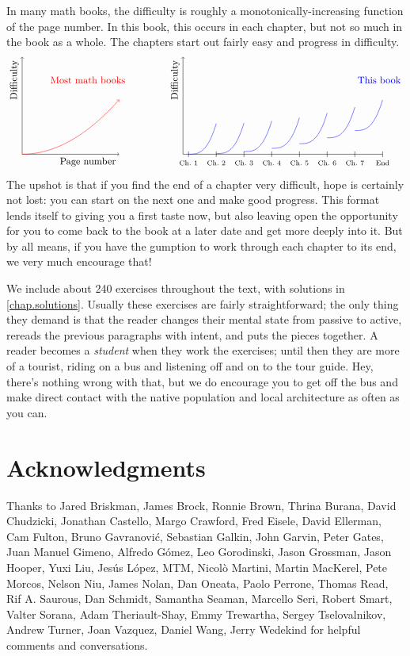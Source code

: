 \documentclass[7Sketches]{subfiles}
\begin{document}
In many math books, the difficulty is roughly a monotonically-increasing function of the page number. In this book, this occurs in each chapter, but not so much in the book as a whole. The chapters start out fairly easy and progress in difficulty.
\[
\begin{tikzpicture}
  \draw[->] (0,0) -- (3.5,0) node[below left] (p) {Page number};
  \draw[->] (0,0) -- (0,3.5) node[above left, rotate=90] (d) {Difficulty};
  \draw[color=red, domain=0:3.5, ->] plot (\x,{.16*\x^2)});
  \node[red] at (p|-d) {Most math books};
%
  \draw (5.8,0) -- (13,0) node[below left] (p) {};
  \draw[->] (5.8,0) -- (5.8,3.5) node[above left, rotate=90] (d) {Difficulty};
  \foreach \i in {1,...,7} {
  	\draw (\i+5,.1) to (\i+5,-.1) node[below, font=\scriptsize] {Ch.\ \i};
    \draw[color=blue, domain=\i+5:\i+6] plot (\x,{1.1*(\x-\i-5)^3+((\i-1)/6.5)^2});
	}
 	\draw (13,.1) to (13,-.1) node[below, font=\scriptsize] {End};
  \node[blue] at (p|-d) {This book};
\end{tikzpicture}
\]
The upshot is that if you find the end of a chapter very difficult, hope is certainly not lost: you can start on the next one and make good progress. This format lends itself to giving you a first taste now, but also leaving open the opportunity for you to come back to the book at a later date and get more deeply into it. But by all means, if you have the gumption to work through each chapter to its end, we very much encourage that!

We include about 240 exercises throughout the text, with solutions in \cref{chap.solutions}. Usually these exercises are fairly straightforward; the only thing they demand is that the reader changes their mental state from passive to active, rereads the previous paragraphs with intent, and puts the pieces together. A reader becomes a \emph{student} when they work the exercises; until then they are more of a tourist, riding on a bus and listening off and on to the tour guide. Hey, there's nothing wrong with that, but we do encourage you to get off the bus and make direct contact with the native population and local architecture as often as you can.

\section*{Acknowledgments}

Thanks to Jared Briskman, James Brock, Ronnie Brown, Thrina Burana, David Chudzicki, Jonathan
Castello, Margo Crawford, Fred Eisele, David Ellerman, Cam Fulton, Bruno
Gavranovi\'c, Sebastian Galkin, John Garvin, Peter Gates, Juan Manuel Gimeno,
Alfredo G\'omez, Leo Gorodinski, Jason Grossman, Jason Hooper, Yuxi Liu, Jes\'us
L\'opez, MTM, Nicol\`o Martini, Martin MacKerel, Pete Morcos, Nelson Niu, James
Nolan, Dan Oneata, Paolo Perrone, Thomas Read, Rif A.  Saurous, Dan Schmidt,
Samantha Seaman, Marcello Seri, Robert Smart, Valter Sorana, Adam
Theriault-Shay, Emmy Trewartha, Sergey Tselovalnikov, Andrew Turner, Joan
Vazquez, Daniel Wang, Jerry Wedekind for helpful comments and conversations.
\end{document}
